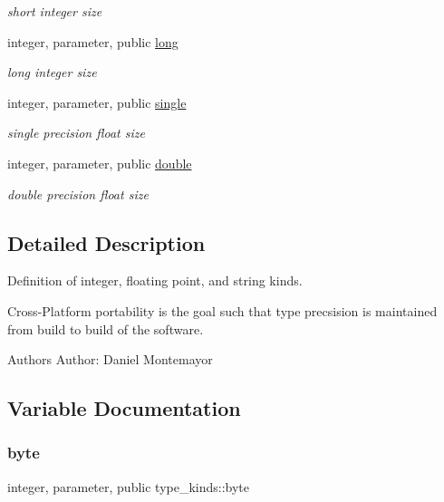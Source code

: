 \begin{DoxyCompactItemize}
\begin{DoxyCompactList}\small\item\em short integer size \end{DoxyCompactList}\item 
integer, parameter, public \hyperlink{namespacetype__kinds_a14af3c9d56db49c61252b056506a584a}{long}
\begin{DoxyCompactList}\small\item\em long integer size \end{DoxyCompactList}\item 
integer, parameter, public \hyperlink{namespacetype__kinds_a1752925d569776fd4a88872a620ed1d0}{single}
\begin{DoxyCompactList}\small\item\em single precision float size \end{DoxyCompactList}\item 
integer, parameter, public \hyperlink{namespacetype__kinds_a34b12277eb02d1bbaaaae83e033d9890}{double}
\begin{DoxyCompactList}\small\item\em double precision float size \end{DoxyCompactList}\end{DoxyCompactItemize}


\subsection{Detailed Description}
Definition of integer, floating point, and string kinds. 

Cross-\/\+Platform portability is the goal such that type precsision is maintained from build to build of the software. \begin{DoxyAuthor}{Authors}
Author\+: Daniel Montemayor 
\end{DoxyAuthor}


\subsection{Variable Documentation}
\mbox{\label{namespacetype__kinds_a13366a08a0935a72c203e1b880b4d49e}} 
\subsubsection{\texorpdfstring{byte}{byte}}
{\footnotesize\ttfamily integer, parameter, public type\+\_\+kinds\+::byte}




